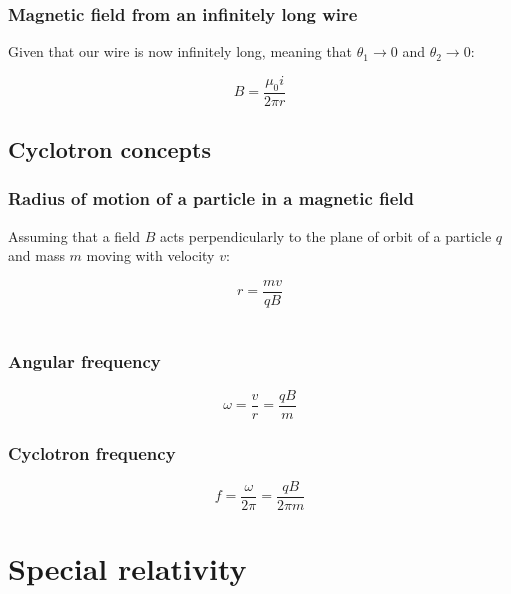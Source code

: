 \documentclass[12pt]{article}
\begin{document}
\subsubsection{Magnetic field from an infinitely long wire}

Given that our wire is now infinitely long, meaning that $\theta_1 \longrightarrow 0$ and $\theta_2 \longrightarrow 0$:

\[
\boxed{
B = \frac{\mu_0 i}{2\pi r}
}
\]

\subsection{Cyclotron concepts}

\subsubsection{Radius of motion of a particle in a magnetic field}

Assuming that a field $B$ acts perpendicularly to the plane of orbit of a particle $q$ and mass $m$ moving with velocity $v$:

\[
\boxed{
r = \frac{mv}{qB}
}
\]\\

\begin{multicols}{2}

\subsubsection{Angular frequency}

\[
\boxed{
\omega = \frac{v}{r}=\frac{qB}{m}
}
\]

\columnbreak

\subsubsection{Cyclotron frequency}

\[
\boxed{
f = \frac{\omega}{2\pi}=\frac{qB}{2\pi m}
}
\]

\end{multicols}


\newpage

\section{Special relativity}
\end{document}
